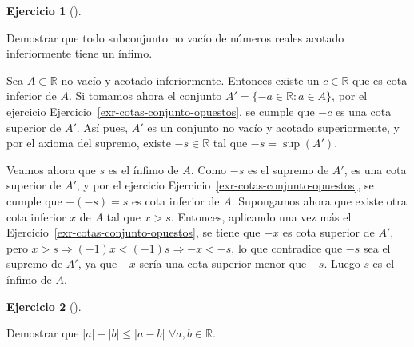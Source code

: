\documentclass[
  a4paper,
]{scrreport}
\theoremstyle{definition}
\newtheorem{exercise}{Ejercicio}[chapter]
\theoremstyle{remark}
\begin{document}
\leavevmode{}%
\begin{exercise}[]\label{exr-propiedad-infimo}

Demostrar que todo subconjunto no vacío de números reales acotado
inferiormente tiene un ínfimo.

\end{exercise}

\begin{tcolorbox}[enhanced jigsaw, coltitle=black, left=2mm, opacityback=0, colback=white, opacitybacktitle=0.6, breakable, colbacktitle=quarto-callout-tip-color!10!white, leftrule=.75mm, toptitle=1mm, arc=.35mm, bottomtitle=1mm, rightrule=.15mm, titlerule=0mm, title=\textcolor{quarto-callout-tip-color}{\faLightbulb}\hspace{0.5em}{Solución}, colframe=quarto-callout-tip-color-frame, toprule=.15mm, bottomrule=.15mm]
Sea \(A\subset\mathbb{R}\) no vacío y acotado inferiormente. Entonces
existe un \(c\in\mathbb{R}\) que es cota inferior de \(A\). Si tomamos
ahora el conjunto \(A'=\{-a\in\mathbb{R}: a\in A\}\), por el ejercicio
Ejercicio~\ref{exr-cotas-conjunto-opuestos}, se cumple que \(-c\) es una
cota superior de \(A'\). Así pues, \(A'\) es un conjunto no vacío y
acotado superiormente, y por el axioma del supremo, existe
\(-s\in\mathbb{R}\) tal que \(-s=\sup(A')\).

Veamos ahora que \(s\) es el ínfimo de \(A\). Como \(-s\) es el supremo
de \(A'\), es una cota superior de \(A'\), y por el ejercicio
Ejercicio~\ref{exr-cotas-conjunto-opuestos}, se cumple que \(-(-s)=s\)
es cota inferior de \(A\). Supongamos ahora que existe otra cota
inferior \(x\) de \(A\) tal que \(x>s\). Entonces, aplicando una vez más
el Ejercicio~\ref{exr-cotas-conjunto-opuestos}, se tiene que \(-x\) es
cota superior de \(A'\), pero
\(x>s\Rightarrow (-1)x<(-1)s \Rightarrow -x<-s\), lo que contradice que
\(-s\) sea el supremo de \(A'\), ya que \(-x\) sería una cota superior
menor que \(-s\). Luego \(s\) es el ínfimo de \(A\).
\end{tcolorbox}

\leavevmode{}%
\begin{exercise}[]\label{exr-propiedad-valor-absoluto}

Demostrar que \(|a|-|b|\leq |a-b|\) \(\forall a,b\in\mathbb{R}\).

\end{exercise}
\end{document}

